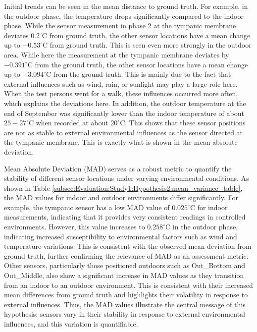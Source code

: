 Initial trends can be seen in the mean distance to ground truth.
For example, in the outdoor phase, the temperature drops significantly compared to the indoor phase.
While the sensor measurement in phase 2 at the tympanic membrane deviates $0.2 ^\circ\text{C}$ from ground truth, the other sensor locations have a mean change up to $-0.53^\circ\text{C}$ from ground truth.
This is seen even more strongly in the outdoor area. 
While here the measurement at the tympanic membrane deviates by $-0.391 ^\circ\text{C}$ from the ground truth, the other sensor locations have a mean change up to $-3.094^\circ\text{C}$ from the ground truth.
This is mainly due to the fact that external influences such as wind, rain, or sunlight may play a large role here.
When the test persons went for a walk, these influences occurred more often, which explains the deviations here. 
In addition, the outdoor temperature at the end of September was significantly lower than the indoor temperature of about $25-27^\circ\text{C}$ when recorded at about $20^\circ\text{C}$.
This shows that these sensor positions are not as stable to external environmental influences as the sensor directed at the tympanic membrane.
This is exactly what is shown in the mean absolute deviation. 

Mean Absolute Deviation (MAD) serves as a robust metric to quantify the stability of different sensor locations under varying environmental conditions. 
As shown in Table \ref{subsec:Evaluation:Study1:Hypothesis2:mean_variance_table}, the MAD values for indoor and outdoor environments differ significantly. 
For example, the tympanic sensor has a low MAD value of \(0.025 ^\circ\text{C}\) for indoor measurements, indicating that it provides very consistent readings in controlled environments. 
However, this value increases to \(0.258 ^\circ\text{C}\) in the outdoor phase, indicating increased susceptibility to environmental factors such as wind and temperature variations. 
This is consistent with the observed mean deviation from ground truth, further confirming the relevance of MAD as an assessment metric. 
Other sensors, particularly those positioned outdoors such as Out\_Bottom and Out\_Middle, also show a significant increase in MAD values as they transition from an indoor to an outdoor environment. 
This is consistent with their increased mean differences from ground truth and highlights their volatility in response to external influences. 
Thus, the MAD values illustrate the central message of this hypothesis: sensors vary in their stability in response to external environmental influences, and this variation is quantifiable.

